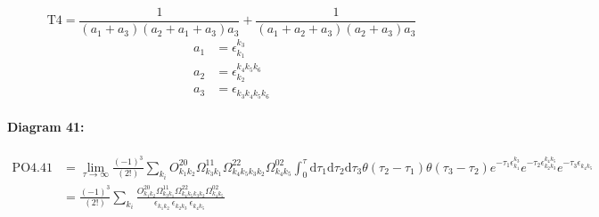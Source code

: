 \documentclass[10pt,a4paper]{article}
\begin{document}
\begin{equation}
\text{T}4 = \frac{1}{(a_1+ a_3)(a_2+ a_1+ a_3)a_3} + \frac{1}{(a_1+ a_2+ a_3)(a_2+ a_3)a_3}\end{equation}
\begin{align*}
a_1 &= \epsilon^{k_{3}}_{k_{1}}\\
a_2 &= \epsilon^{k_{4}k_{5}k_{6}}_{k_{2}}\\
a_3 &= \epsilon^{}_{k_{3}k_{4}k_{5}k_{6}}
\end{align*}
\paragraph{Diagram 41:}
\begin{align}
\text{PO}4.41
&= \lim\limits_{\tau \to \infty}\frac{(-1)^3 }{(2!)}\sum_{k_i}O^{20}_{k_{1}k_{2}} \Omega^{11}_{k_{3}k_{1}} \Omega^{22}_{k_{4}k_{5}k_{3}k_{2}} \Omega^{02}_{k_{4}k_{5}} \int_{0}^{\tau}\mathrm{d}\tau_1\mathrm{d}\tau_2\mathrm{d}\tau_3\theta(\tau_2-\tau_1) \theta(\tau_3-\tau_2) e^{-\tau_1 \epsilon^{k_{3}}_{k_{1}}}e^{-\tau_2 \epsilon^{k_{4}k_{5}}_{k_{2}k_{3}}}e^{-\tau_3 \epsilon^{}_{k_{4}k_{5}}}
 \nonumber \\
&= \frac{(-1)^3 }{(2!)}\sum_{k_i}\frac{O^{20}_{k_{1}k_{2}} \Omega^{11}_{k_{3}k_{1}} \Omega^{22}_{k_{4}k_{5}k_{3}k_{2}} \Omega^{02}_{k_{4}k_{5}} }{\epsilon^{}_{k_{1}k_{2}}\ \epsilon^{}_{k_{2}k_{3}}\ \epsilon^{}_{k_{4}k_{5}}\ } 
\end{align}
\end{document}
